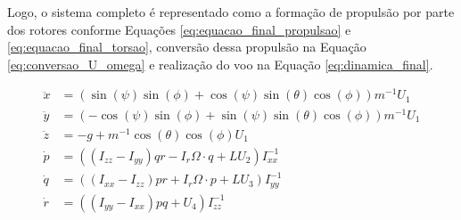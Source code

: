 \documentclass[main.tex]{subfiles}
\begin{document}
Logo, o sistema completo é representado como a formação de propulsão por parte dos rotores conforme Equações \ref{eq:equacao_final_propulsao} e \ref{eq:equacao_final_torsao}, conversão dessa propulsão na Equação \ref{eq:conversao_U_omega} e realização do voo na Equação \ref{eq:dinamica_final}.

\begin{equation}\label{eq:dinamica_final}
	\begin{split}
		\ddot{x} &= (\sin{(\psi)}\sin{(\phi)} + \cos{(\psi)}\sin{(\theta)}\cos{(\phi)})m^{-1}U_1\\
		\ddot{y} &= (-\cos{(\psi)}\sin{(\phi)} + \sin{(\psi)}\sin{(\theta)}\cos{(\phi)})m^{-1}U_1\\
		\ddot{z} &= -g + m^{-1}\cos{(\theta)}\cos{(\phi)}U_1\\
		\dot{p} &= \left((I_{zz} - I_{yy})qr - I_r\Omega\cdot q + LU_2\right)I_{xx}^{-1}\\
		\dot{q} &= \left((I_{xx} - I_{zz})pr + I_r\Omega\cdot p + LU_3\right)I_{yy}^{-1}\\
		\dot{r} &= \left((I_{yy} - I_{xx})pq + U_4\right)I_{zz}^{-1}\\
	\end{split}
\end{equation}
\end{document}
